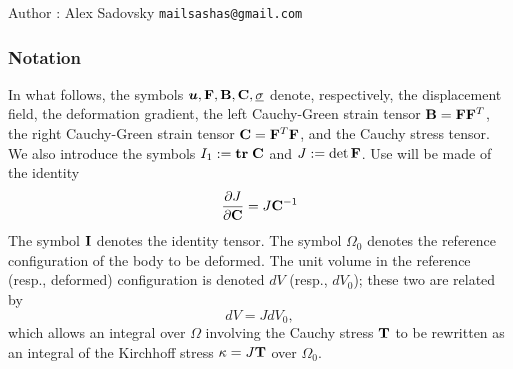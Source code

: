\documentclass[a4paper,twoside,12pt]{book}
\def\vec#1{\mbox{\boldmath $#1$}}
\begin{document}
Author : Alex Sadovsky \texttt{mailsashas@gmail.com}

\def\bR{{\bf R}}
\def\bP{{\bf P}}
\def\bZ{{\bf Z}}
\def\bC{{\bf C}}
\def\VS{\bR^2}
\def\SVS{\underline V}
\def\SO{{\bf SO}}
\def\Sym{{\bf Sym}}
\def\qi{{\bf i}}
\def\qj{{\bf j}}
\def\qk{{\bf k}}
\def\ec{\hat{\bf e}}
\def\xc{\hat{\bf x}}
\def\bdr{\partial}
\def\PD{\partial_}
\def\strain{\underline \epsilon}
\def\stress{\underline \sigma}
\def\strainrate{\underline \epsilon^.}
\def\stressrate{\underline \sigma^.}
\def\stiff{\; \underline{\underline C}\;}
\def\comply{\underline{\underline \kappa}\;}
\def\Id{{\bf I}}
\def\Div{\nabla \cdot}
\def\Grad{\vec{\nabla}}
\def\rot{\nabla \times}
\def\lap{\triangle}
\def\tr{{\bf tr}\;}
\def\udH{\underline H}
\def\refX{\vec X}
\def\Jac{\overline{J}}
\def\spatx{\vec x}
\def\ani{\overline a}
\def\mat{\left[\begin{array}}
\def\tam{\end{array}\right]}
\def\arr{\left.\begin{array}}
\def\rra{\end{array}\right\}}
\def\arl{\left\{\begin{array}}
\def\lra{\end{array}\right.}
\def\ar{\begin{array}}
\def\ra{\end{array}}
\def\const{\mbox{ const.}}
\def\eps{\; \epsilon}
\def\sig{\; \sigma}
\def\th{\theta}
\def\sgn{\mbox{sgn}}
\def\qed{\; Q.E.D.\\}

\def\eqn{\begin{equation}}
\def\nqe{\end{equation}}

\def\eqnar{\begin{eqnarray}}
\def\ranqe{\end{eqnarray}}

\def\ol{\overline}
\def\ul{\underline}

\def\bB{{\bf B}}
\def\bC{{\bf C}}
\def\bD{{\bf D}}
\def\bE{{\bf E}}
\def\bF{{\bf F}}
\def\bK{{\bf K}}
\def\bP{{\bf P}}
\def\bS{{\bf S}}
\def\bT{{\bf T}}
\def\bsig{{\bf \sigma}}

\subsubsection{Notation}
In what follows, the symbols $\vec{u}, \bF, \bB, \bC, \stress$
denote, respectively, the displacement field, the deformation
gradient, the left Cauchy-Green strain tensor $\bB = \bF \bF^T$, the
right Cauchy-Green strain tensor $\bC =\bF^T \bF$, and the Cauchy stress
tensor.  We also introduce the symbols $I_1 := \tr \bC$ and $J := \det
\bF$.  Use will be made of the identity
\eqn
{\PD{}J \over \PD{}\bC} = J \bC^{-1}
\nqe
The symbol $\Id$ denotes the identity tensor.  The symbol $\Omega_{0}$
denotes the reference configuration of the body to be deformed.  The
unit volume in the reference (resp., deformed) configuration is
denoted $dV$ (resp., $dV_{0}$); these two are related by
$$
dV = J dV_{0},
$$
which allows an integral over $\Omega$ involving the Cauchy stress
$\bT$ to be rewritten as an integral of the Kirchhoff stress $\kappa =
J \bT$ over $\Omega_{0}$.
\end{document}
